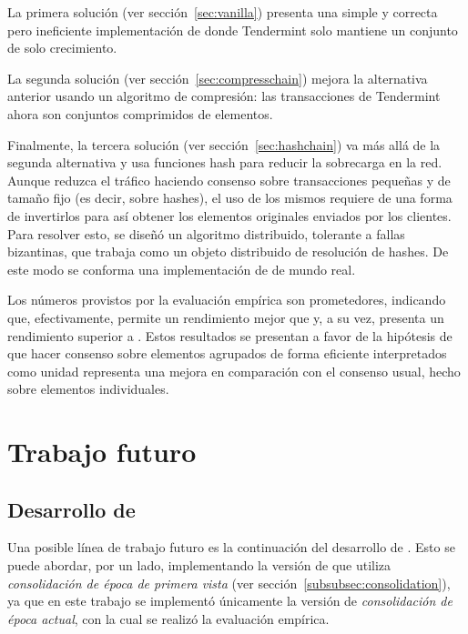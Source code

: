%
La primera solución (ver sección~\ref{sec:vanilla}) presenta una simple y
correcta pero ineficiente implementación de \setchain donde Tendermint solo mantiene
un conjunto de solo crecimiento.

%
La segunda solución (ver sección~\ref{sec:compresschain}) mejora la alternativa anterior
usando un algoritmo de compresión: las transacciones de Tendermint ahora son conjuntos
comprimidos de elementos.

%
Finalmente, la tercera solución (ver sección~\ref{sec:hashchain}) va más allá de la
segunda alternativa y usa funciones hash para reducir la sobrecarga en la red.
Aunque reduzca el tráfico haciendo consenso sobre transacciones pequeñas
y de tamaño fijo (es decir, sobre hashes), el uso de los mismos requiere de una forma de
invertirlos para así obtener los elementos originales enviados por los clientes.
Para resolver esto, se diseñó
un algoritmo distribuido, tolerante a fallas bizantinas, que trabaja como un objeto
distribuido de resolución de hashes.
De este modo se conforma una implementación de \setchain de mundo real.

%
%


Los números provistos por la evaluación empírica son prometedores, indicando que,
efectivamente, \compresschain permite un rendimiento mejor que \vanilla y, a su vez,
\hashchain presenta un rendimiento superior a \compresschain.
Estos resultados se presentan a favor de la hipótesis de que hacer consenso sobre
elementos agrupados de forma eficiente interpretados como unidad representa una
mejora en comparación con el consenso usual, hecho sobre elementos individuales. 

\section{Trabajo futuro}

\subsection{Desarrollo de \hashchain}
Una posible línea de trabajo futuro es la continuación del desarrollo
de \hashchain.
Esto se puede abordar, por un lado, implementando la versión de \hashchain que utiliza
\textit{consolidación de época de primera vista} (ver sección~\ref{subsubsec:consolidation}),
ya que en este trabajo se implementó únicamente la versión
de \textit{consolidación de época actual}, con la cual se realizó la evaluación
empírica.

